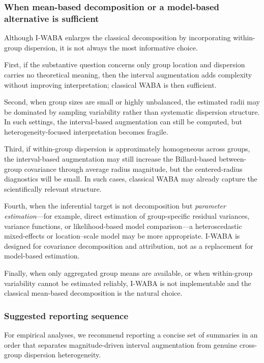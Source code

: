 \documentclass[preprint, times, 12pt, authoryear]{elsarticle}
\begin{document}
\subsubsection{When mean-based decomposition or a model-based alternative is sufficient}

Although I-WABA enlarges the classical decomposition by incorporating within-group dispersion, it is not always the most informative choice.

First, if the substantive question concerns only group location and dispersion carries no theoretical meaning, then the interval augmentation adds complexity without improving interpretation; classical WABA is then sufficient.

Second, when group sizes are small or highly unbalanced, the estimated radii may be dominated by sampling variability rather than systematic dispersion structure. In such settings, the interval-based augmentation can still be computed, but heterogeneity-focused interpretation becomes fragile.

Third, if within-group dispersion is approximately homogeneous across groups, the interval-based augmentation may still increase the Billard-based between-group covariance through average radius magnitude, but the centered-radius diagnostics will be small. In such cases, classical WABA may already capture the scientifically relevant structure.

Fourth, when the inferential target is not decomposition but \emph{parameter estimation}---for example, direct estimation of group-specific residual variances, variance functions, or likelihood-based model comparison---a heteroscedastic mixed-effects or location--scale model may be more appropriate. I-WABA is designed for covariance decomposition and attribution, not as a replacement for model-based estimation.

Finally, when only aggregated group means are available, or when within-group variability cannot be estimated reliably, I-WABA is not implementable and the classical mean-based decomposition is the natural choice.

\subsubsection{Suggested reporting sequence}\label{sec:practical_reco}

For empirical analyses, we recommend reporting a concise set of summaries in an order that separates magnitude-driven interval augmentation from genuine cross-group dispersion heterogeneity.
\end{document}
